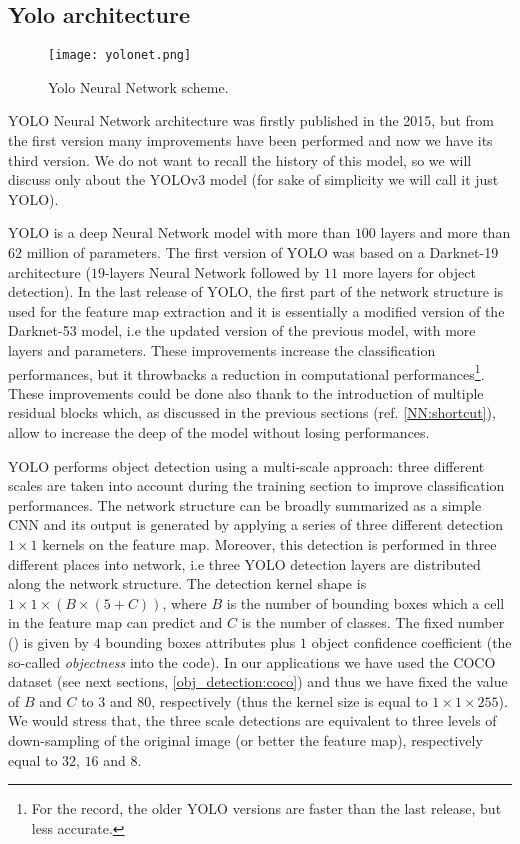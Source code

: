\documentclass{standalone}
\begin{document}
\subsection[Yolo]{Yolo architecture}\label{obj_detection:yolo}

\begin{center}
\begin{figure}[htbp]
\centering
\texttt{[image: yolonet.png]}
\caption{Yolo Neural Network scheme.
}
\label{fig:yolo}
\end{figure}
\end{center}

YOLO Neural Network architecture was firstly published in the 2015, but from the first version many improvements have been performed and now we have its third version.
We do not want to recall the history of this model, so we will discuss only about the YOLOv3 model (for sake of simplicity we will call it just YOLO).

YOLO is a deep Neural Network model with more than $100$ layers and more than $62$ million of parameters.
The first version of YOLO was based on a Darknet-19 architecture ($19$-layers Neural Network followed by $11$ more layers for object detection).
In the last release of YOLO, the first part of the network structure is used for the feature map extraction and it is essentially a modified version of the Darknet-53 model, i.e the updated version of the previous model, with more layers and parameters.
These improvements increase the classification performances, but it throwbacks a reduction in computational performances\footnote{
  For the record, the older YOLO versions are faster than the last release, but less accurate.
}.
These improvements could be done also thank to the introduction of multiple residual blocks which, as discussed in the previous sections (ref. \ref{NN:shortcut}), allow to increase the deep of the model without losing performances.

YOLO performs object detection using a multi-scale approach: three different scales are taken into account during the training section to improve classification performances.
The network structure can be broadly summarized as a simple CNN and its output is generated by applying a series of three different detection $1\times1$ kernels on the feature map.
Moreover, this detection is performed in three different places into network, i.e three YOLO detection layers are distributed along the network structure.
The detection kernel shape is $1\times1\times(B\times(5 + C))$, where $B$ is the number of bounding boxes which a cell in the feature map can predict and $C$ is the number of classes.
The fixed number () is given by $4$ bounding boxes attributes plus $1$ object confidence coefficient (the so-called \emph{objectness} into the code).
In our applications we have used the COCO dataset (see next sections, \ref{obj_detection:coco}) and thus we have fixed the value of $B$ and $C$ to $3$ and $80$, respectively (thus the kernel size is equal to $1\times1\times255$).
We would stress that, the three scale detections are equivalent to three levels of down-sampling of the original image (or better the feature map), respectively equal to $32$, $16$ and $8$.
\end{document}
